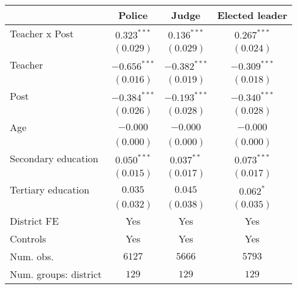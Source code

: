 
\begin{tabular}{l c c c}
\toprule
 & Police & Judge & Elected leader \\
\midrule
Teacher x Post        & $0.323^{***}$  & $0.136^{***}$  & $0.267^{***}$  \\
                      & $(0.029)$      & $(0.029)$      & $(0.024)$      \\
Teacher               & $-0.656^{***}$ & $-0.382^{***}$ & $-0.309^{***}$ \\
                      & $(0.016)$      & $(0.019)$      & $(0.018)$      \\
Post                  & $-0.384^{***}$ & $-0.193^{***}$ & $-0.340^{***}$ \\
                      & $(0.026)$      & $(0.028)$      & $(0.028)$      \\
Age                   & $-0.000$       & $-0.000$       & $-0.000$       \\
                      & $(0.000)$      & $(0.000)$      & $(0.000)$      \\
Secondary education   & $0.050^{***}$  & $0.037^{**}$   & $0.073^{***}$  \\
                      & $(0.015)$      & $(0.017)$      & $(0.017)$      \\
Tertiary education    & $0.035$        & $0.045$        & $0.062^{*}$    \\
                      & $(0.032)$      & $(0.038)$      & $(0.035)$      \\
\midrule
District FE           & Yes            & Yes            & Yes            \\
Controls              & Yes            & Yes            & Yes            \\
Num. obs.             & $6127$         & $5666$         & $5793$         \\
Num. groups: district & $129$          & $129$          & $129$          \\
\bottomrule
\end{tabular}

